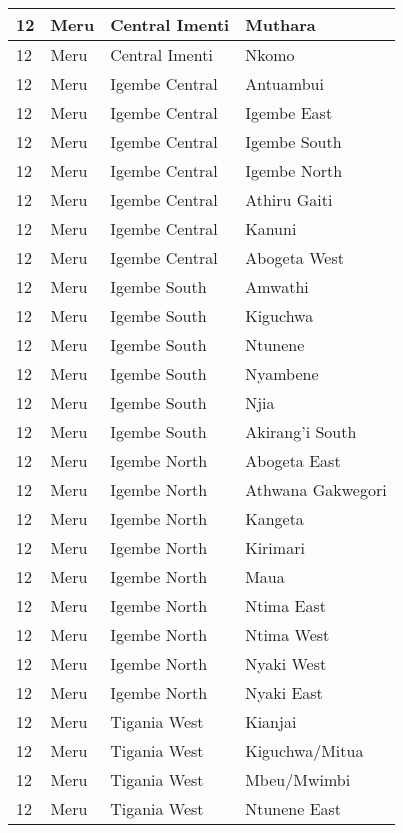 \begin{table}[!ht]
\begin{tabular}{|l|l|l|l|}
        12 & Meru & Central Imenti & Muthara \\ \hline
        12 & Meru & Central Imenti & Nkomo \\ \hline
        12 & Meru & Igembe Central & Antuambui \\ \hline
        12 & Meru & Igembe Central & Igembe East \\ \hline
        12 & Meru & Igembe Central & Igembe South \\ \hline
        12 & Meru & Igembe Central & Igembe North \\ \hline
        12 & Meru & Igembe Central & Athiru Gaiti \\ \hline
        12 & Meru & Igembe Central & Kanuni \\ \hline
        12 & Meru & Igembe Central & Abogeta West \\ \hline
        12 & Meru & Igembe South & Amwathi \\ \hline
        12 & Meru & Igembe South & Kiguchwa \\ \hline
        12 & Meru & Igembe South & Ntunene \\ \hline
        12 & Meru & Igembe South & Nyambene \\ \hline
        12 & Meru & Igembe South & Njia \\ \hline
        12 & Meru & Igembe South & Akirang’i South \\ \hline
        12 & Meru & Igembe North & Abogeta East \\ \hline
        12 & Meru & Igembe North & Athwana Gakwegori \\ \hline
        12 & Meru & Igembe North & Kangeta \\ \hline
        12 & Meru & Igembe North & Kirimari \\ \hline
        12 & Meru & Igembe North & Maua \\ \hline
        12 & Meru & Igembe North & Ntima East \\ \hline
        12 & Meru & Igembe North & Ntima West \\ \hline
        12 & Meru & Igembe North & Nyaki West \\ \hline
        12 & Meru & Igembe North & Nyaki East \\ \hline
        12 & Meru & Tigania West & Kianjai \\ \hline
        12 & Meru & Tigania West & Kiguchwa/Mitua \\ \hline
        12 & Meru & Tigania West & Mbeu/Mwimbi \\ \hline
        12 & Meru & Tigania West & Ntunene East \\ \hline

\end{tabular}
\end{table}
